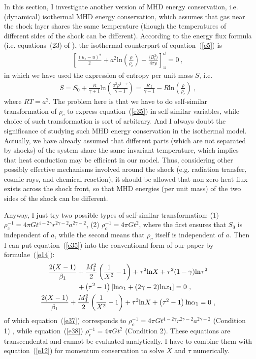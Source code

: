 \documentclass[fleqn,usenatbib]{mnras}
\begin{document}
In this section, I investigate another version of MHD energy conservation, i.e. (dynamical) isothermal MHD energy conservation, which assumes that gas near the shock layer shares the same temperature (though the temperatures of different sides of the shock can be different). According to the energy flux formula (i.e. equations~(23) of \citet{lou2004envelope}), the isothermal counterpart of equation~(\ref{e5}) is
\begin{gather}
\left[\frac{\left(u_{s}-u\right)^{2}}{2}+a^{2}\mathrm{ln}\left(\frac{\rho}{\rho_{c}}\right)+\frac{\langle B_{t}^{2}\rangle}{4\pi \rho}\right]_{u}^{d}=0\ ,\label{e35}
\end{gather} 
in which we have used the expression of entropy per unit mass $S$, i.e.
\begin{gather}
S=S_{0}+\frac{R}{\gamma+1}\mathrm{ln}\left(\frac{a^{2}\rho^{1-\gamma}}{\gamma-1}\right)=\frac{R\gamma}{\gamma-1}-R\mathrm{ln}\left(\frac{\rho}{\rho_{c}}\right)\ ,\label{e36}
\end{gather}
where $RT=a^{2}$. The problem here is that we have to do self-similar transformation of $\rho_{c}$ to express equation~(\ref{e35}) in self-similar variables, while choice of such transformation is sort of arbitrary. And I always doubt the significance of studying such MHD energy conservation in the isothermal model. Actually, we have already assumed that different parts (which are not separated by shocks) of the system share the same invariant temperature, which implies that heat conduction may be efficient in our model. Thus, considering other possibly effective mechanisms involved around the shock (e.g. radiation transfer, cosmic rays, and chemical reaction), it should be allowed that non-zero heat flux exists across the shock front, so that MHD energies (per unit mass) of the two sides of the shock can be different. 

Anyway, I just try two possible types of self-similar transformation: (1) $\rho_{c}^{-1}=4\pi Gt^{4-2\gamma}r^{2\gamma-2}a^{2\gamma-2}$, (2) $\rho_{c}^{-1}=4\pi Gt^{2}$, where the first ensures that $S_{0}$ is independent of $a$, while the second means that $\rho_{c}$ itself is independent of $a$. Then I can put equation~(\ref{e35}) into the conventional form of our paper by formulae~(\ref{e14}):
\begin{gather}
\frac{2(X-1)}{\beta_{1}}+\frac{M_{1}^{2}}{2}\left(\frac{1}{X^{2}}-1\right)+\tau^{2}\mathrm{ln}X+\tau^{2}(1-\gamma)\mathrm{ln}\tau^{2}\notag\\
\qquad +\left(\tau^{2}-1\right)\left[\mathrm{ln}\alpha_{1}+(2\gamma-2)\mathrm{ln}x_{1}\right]=0\ ,\label{e37}\\
\frac{2(X-1)}{\beta_{1}}+\frac{M_{1}^{2}}{2}\left(\frac{1}{X^{2}}-1\right)+\tau^{2}\mathrm{ln}X+\left(\tau^{2}-1\right)\mathrm{ln}\alpha_{1}=0\ ,\label{e38}
\end{gather}
of which equation~(\ref{e37}) corresponds to $\rho_{c}^{-1}=4\pi Gt^{4-2\gamma}r^{2\gamma-2}a^{2\gamma-2}$ (Condition 1) , while equation~(\ref{e38}) $\rho_{c}^{-1}=4\pi Gt^{2}$ (Condition 2). These equations are transcendental and cannot be evaluated analytically. I have to combine them with equation~(\ref{e12}) for momentum conservation to solve $X$ and $\tau$ numerically. 
\end{document}
